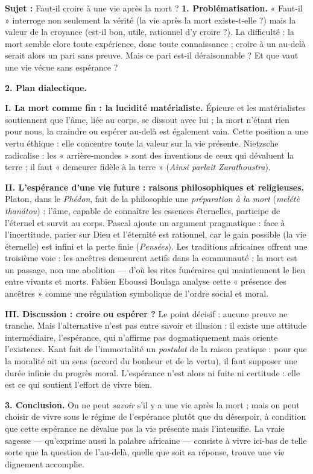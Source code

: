 \documentclass[11pt]{article}
\newcommand{\cle}[1]{{\popxbold\color{popdark}#1}}
\begin{document}
\begin{exoresolu}
\textbf{Sujet :} Faut-il croire à une vie après la mort ?
\tcblower
\textbf{1. Problématisation.} « Faut-il » interroge non seulement la vérité (la vie après la mort existe-t-elle ?) mais la valeur de la croyance (est-il bon, utile, rationnel d'y croire ?). La difficulté : la mort semble clore toute expérience, donc toute connaissance ; croire à un au-delà serait alors un pari sans preuve. Mais ce pari est-il déraisonnable ? Et que vaut une vie vécue sans espérance ?

\textbf{2. Plan dialectique.}

\textbf{I. La mort comme fin : la lucidité matérialiste.} Épicure et les matérialistes soutiennent que l'âme, liée au corps, se dissout avec lui ; la mort n'étant rien pour nous, la craindre ou espérer au-delà est également vain. Cette position a une vertu éthique : elle concentre toute la valeur sur la vie présente. Nietzsche radicalise : les « arrière-mondes » sont des inventions de ceux qui dévaluent la terre ; il faut « demeurer fidèle à la terre » (\emph{Ainsi parlait Zarathoustra}).

\textbf{II. L'espérance d'une vie future : raisons philosophiques et religieuses.} Platon, dans le \emph{Phédon}, fait de la philosophie une \emph{préparation à la mort} (\emph{melétè thanátou}) : l'âme, capable de connaître les essences éternelles, participe de l'éternel et survit au corps. Pascal ajoute un argument pragmatique : face à l'incertitude, parier sur Dieu et l'éternité est rationnel, car le gain possible (la vie éternelle) est infini et la perte finie (\emph{Pensées}). Les traditions africaines offrent une troisième voie : les ancêtres demeurent actifs dans la communauté ; la mort est un passage, non une abolition — d'où les rites funéraires qui maintiennent le lien entre vivants et morts. Fabien Eboussi Boulaga analyse cette « présence des ancêtres » comme une régulation symbolique de l'ordre social et moral.

\textbf{III. Discussion : croire ou espérer ?} Le point décisif : aucune preuve ne tranche. Mais l'alternative n'est pas entre savoir et illusion : il existe une attitude intermédiaire, l'\cle{espérance}, qui n'affirme pas dogmatiquement mais oriente l'existence. Kant fait de l'immortalité un \emph{postulat} de la raison pratique : pour que la moralité ait un sens (accord du bonheur et de la vertu), il faut supposer une durée infinie du progrès moral. L'espérance n'est alors ni fuite ni certitude : elle est ce qui soutient l'effort de vivre bien.

\textbf{3. Conclusion.} On ne peut \emph{savoir} s'il y a une vie après la mort ; mais on peut choisir de vivre sous le régime de l'espérance plutôt que du désespoir, à condition que cette espérance ne dévalue pas la vie présente mais l'intensifie. La vraie sagesse — qu'exprime aussi la palabre africaine — consiste à vivre ici-bas de telle sorte que la question de l'au-delà, quelle que soit sa réponse, trouve une vie dignement accomplie.
\end{exoresolu}
\end{document}
